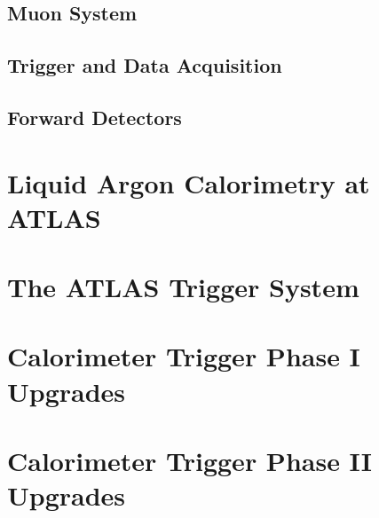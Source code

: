 \subsection{Muon System}

%
\subsection{Trigger and Data Acquisition} %

\subsection{Forward Detectors}

\section{Liquid Argon Calorimetry at ATLAS}




\section{The ATLAS Trigger System}

\section{Calorimeter Trigger Phase I Upgrades}




\section{Calorimeter Trigger Phase II Upgrades}


